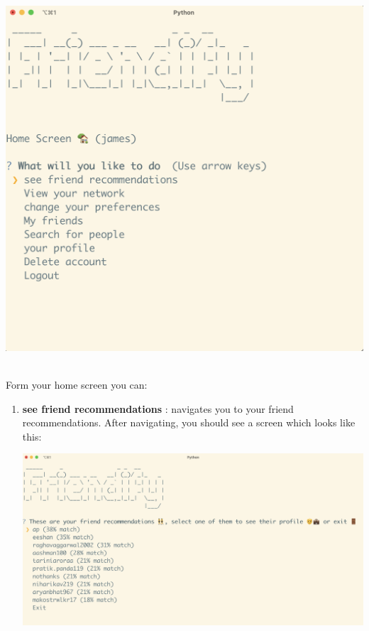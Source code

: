 \documentclass[11pt]{report}
\begin{document}
\begin{enumerate}
     \begin{center}
             \includegraphics[scale = .45]{Images/signedin100.png}
      \end{center}~\\
      
      Form your home screen you can:
      
      \begin{enumerate}
          \item {\bf see friend recommendations } : navigates you to your friend recommendations. After navigating, you should see a screen which looks like this: 
          
          \begin{center}
             \includegraphics[scale = .3]{Images/recc100.png}
      \end{center}
      

\end{enumerate}
\end{enumerate}
\end{document}

